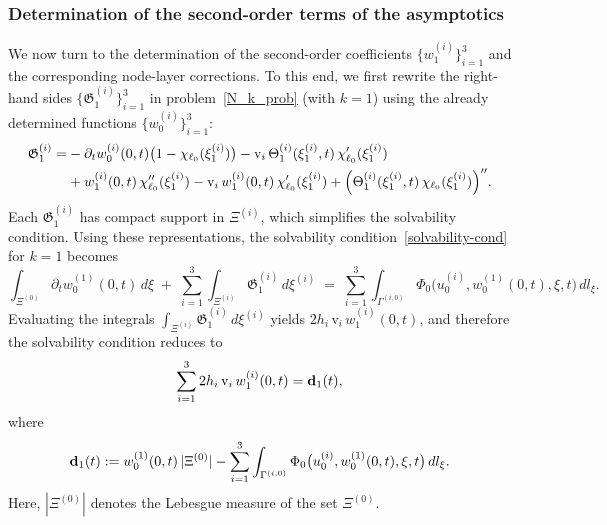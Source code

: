 \documentclass[reqno]{amsart}            %
\numberwithin{equation}{section}
\begin{document}
	\subsubsection{Determination of the second-order terms of the asymptotics}
	We now turn to the determination of the second-order coefficients $\{w^{(i)}_1\}_{i=1}^3$ and the corresponding node-layer corrections.  
	To this end, we first rewrite the right-hand sides $\{\mathfrak{G}^{(i)}_1\}_{i=1}^3$ in problem~\eqref{N_k_prob} (with $k=1$) using the already determined functions $\{w^{(i)}_0\}_{i=1}^3$:
	\begin{align} \label{G1}
		\mathfrak{G}^{(i)}_1 = & - \partial_t w^{(i)}_0(0,t) \big(1 - \chi_{\ell_0}(\xi^{(i)}_1)\big) - \mathrm{v}_i\, \Theta^{(i)}_{1}(\xi^{(i)}_1,t) \,\chi'_{\ell_0}(\xi^{(i)}_1) \notag
		\\
		& + w^{(i)}_1(0,t) \, \chi''_{\ell_0}(\xi^{(i)}_1) 
		- \mathrm{v}_i  \, w^{(i)}_1(0,t) \, \chi'_{\ell_0}(\xi^{(i)}_1) + \Big(\Theta^{(i)}_{1}(\xi^{(i)}_1,t) \,\chi_{\ell_0}(\xi^{(i)}_1)\Big)'' .
	\end{align}
	Each $\mathfrak{G}^{(i)}_1$ has compact support in $\Xi^{(i)}$, which simplifies the solvability condition.
	Using these representations, the solvability condition~\eqref{solvability-cond} for $k=1$ becomes
	\[
	\int_{\Xi^{(0)}} \partial_t w^{(1)}_0(0,t) \, d\xi
	\;+\;
	\sum_{i=1}^{3}\int_{\Xi^{(i)}} \mathfrak{G}^{(i)}_1 \, d\xi^{(i)}
	\;=\;
	\sum_{i=1}^{3}\int_{\Gamma^{(i,0)}}
	\Phi_0\big(u^{(i)}_0, w^{(1)}_0(0,t), \xi,t\big)\, dl_\xi.
	\]
	Evaluating the integrals $\int_{\Xi^{(i)}} \mathfrak{G}^{(i)}_1\,d\xi^{(i)}$ yields $2h_i\,\mathrm{v}_i\,w^{(i)}_1(0,t)$, and therefore the solvability condition reduces to
	\[
	\sum_{i=1}^{3} 2 h_i\,\mathrm{v}_i\, w_1^{(i)}(0,t)
	= {\bf d}_1(t),
	\]
	where
	\begin{equation}\label{d_1}
		{\bf d}_1(t)
		:= w^{(1)}_0(0,t)\, |\Xi^{(0)}|
		- \sum_{i=1}^{3}\int_{\Gamma^{(i,0)}}
		\Phi_0\big(u^{(i)}_0, w^{(1)}_0(0,t), \xi,t\big)\, dl_\xi.
	\end{equation}
	Here, $|\Xi^{(0)}|$ denotes the Lebesgue measure of the set $\Xi^{(0)}.$
	
\end{document}
